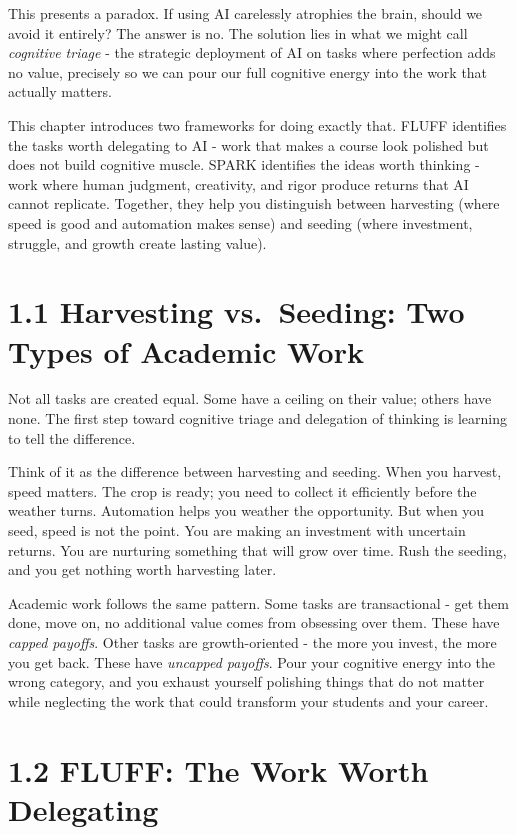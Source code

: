 \documentclass[
  letterpaper,
  DIV=11,
  numbers=noendperiod]{scrreprt}
\newcounter{none} %
\begin{document}
This presents a paradox. If using AI carelessly atrophies the brain,
should we avoid it entirely? The answer is no. The solution lies in what
we might call \emph{cognitive triage} - the strategic deployment of AI
on tasks where perfection adds no value, precisely so we can pour our
full cognitive energy into the work that actually matters.

This chapter introduces two frameworks for doing exactly that. FLUFF
identifies the tasks worth delegating to AI - work that makes a course
look polished but does not build cognitive muscle. SPARK identifies the
ideas worth thinking - work where human judgment, creativity, and rigor
produce returns that AI cannot replicate. Together, they help you
distinguish between harvesting (where speed is good and automation makes
sense) and seeding (where investment, struggle, and growth create
lasting value).

\section{1.1 Harvesting vs.~Seeding: Two Types of Academic
Work}\label{harvesting-vs.-seeding-two-types-of-academic-work}

Not all tasks are created equal. Some have a ceiling on their value;
others have none. The first step toward cognitive triage and delegation
of thinking is learning to tell the difference.

Think of it as the difference between harvesting and seeding. When you
harvest, speed matters. The crop is ready; you need to collect it
efficiently before the weather turns. Automation helps you weather the
opportunity. But when you seed, speed is not the point. You are making
an investment with uncertain returns. You are nurturing something that
will grow over time. Rush the seeding, and you get nothing worth
harvesting later.

Academic work follows the same pattern. Some tasks are transactional -
get them done, move on, no additional value comes from obsessing over
them. These have \emph{capped payoffs}. Other tasks are growth-oriented
- the more you invest, the more you get back. These have \emph{uncapped
payoffs}. Pour your cognitive energy into the wrong category, and you
exhaust yourself polishing things that do not matter while neglecting
the work that could transform your students and your career.

\section{1.2 FLUFF: The Work Worth
Delegating}\label{fluff-the-work-worth-delegating}
\end{document}
